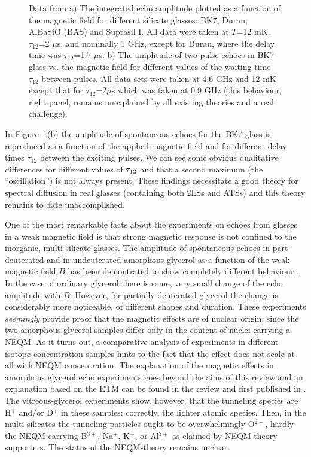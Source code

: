 \documentclass[10pt]{article}
\begin{document}
\begin{figure}[h!]
\centering
\caption{Data from \cite{Lud2003} a) The integrated echo amplitude plotted as a 
function of the magnetic field for different silicate glasses: BK7, Duran, AlBaSiO 
(BAS) and Suprasil I. All data were taken at $T$=12 mK, $\tau_{12}$=2 $\mu$s, 
and nominally 1 GHz, except for Duran, where the delay time was $\tau_{12}$=1.7 
$\mu$s. b) The amplitude of two-pulse echoes in BK7 glass vs. the magnetic field 
for different values of the waiting time $\tau_{12}$ between pulses. All data 
sets were taken at 4.6 GHz and 12 mK except that for $\tau_{12}$=2$\mu$s 
which was taken at 0.9 GHz (this behaviour, right panel, remains unexplained by 
all existing theories and a real challenge). }
\label{image3-4e}
\end{figure}
In Figure~\ref{image3-4e}(b) the amplitude of spontaneous echoes for the BK7 
glass is reproduced as a function of the applied magnetic field and for different 
delay times $\tau_{12}$ between the exciting pulses. We can see some obvious 
qualitative differences for different values of $\tau_{\rm 12}$ and that a second 
maximum (the ``oscillation'') is not always present. These findings necessitate a 
good theory for spectral diffusion \cite{Bla1977} in real glasses (containing both 
2LSs and ATSs)  and this theory remains to date unaccomplished. 

One of the most remarkable facts about the experiments on echoes from glasses 
in a weak magnetic field is that strong magnetic response is not confined to the 
inorganic, multi-silicate glasses. The amplitude of spontaneous echoes in 
part-deuterated and in undeuterated amorphous glycerol as a function of the weak 
magnetic field $B$ has been demontrated to show completely different behaviour 
\cite{Nag2004}. In the case of ordinary glycerol there is some, very small change 
of the echo amplitude with $B$. However, for partially deuterated glycerol the 
change is considerably more noticeable, of different shapes and duration. These 
experiments {\it seemingly} provide proof that the magnetic effects are of nuclear 
origin, since the two amorphous glycerol samples differ only in the content of 
nuclei carrying a NEQM. As it turns out, a comparative analysis of experiments in 
different isotope-concentration samples hints to the fact that the effect does not 
scale at all with NEQM concentration. The explanation of the magnetic effects in 
amorphous glycerol echo experiments goes beyond the aims of this review and 
an explanation based on the ETM can be found in the review \cite{JBK2016} and
first published in \cite{Jug2014}. The vitreous-glycerol experiments show, however,
that the tunneling species are H$^+$ and/or D$^+$ in these samples: correctly, 
the lighter atomic species. Then, in the multi-silicates the tunneling particles ought 
to be overwhelmingly O$^{2-}$, hardly the NEQM-carrying B$^{3+}$, Na$^+$, 
K$^+$, or Al$^{3+}$ as claimed by NEQM-theory supporters. The status of the
NEQM-theory remains unclear.
\end{document}
